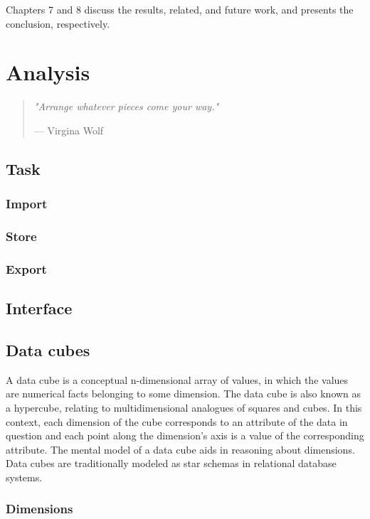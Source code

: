 \documentclass[a4paper,10pt]{book}
\newcommand{\chapterquote}[2] {
\begin{quote}
\textit{"{#1}"}

--- {#2}
\end{quote}

\vspace{24pt}
}
\begin{document}
Chapters 7 and 8 discuss the results, related, and future work, and
presents the conclusion, respectively.




\chapter{Analysis}

\chapterquote{Arrange whatever pieces come your way.}{Virgina Wolf}


\section{Task}

\subsection{Import}

\subsection{Store}

\subsection{Export}

\section{Interface}


\section{Data cubes}

A data cube is a conceptual n-dimensional array of values, in which the values
are numerical facts belonging to some dimension. The data cube is also known as
a hypercube, relating to multidimensional analogues of squares and cubes. In
this context, each dimension of the cube corresponds to an attribute of the
data in question and each point along the dimension's axis is a value of the
corresponding attribute. The mental model of a data cube aids in reasoning
about dimensions. Data cubes are traditionally modeled as star schemas in
relational database systems. \cite{olap_solutions}


\subsection{Dimensions}
\end{document}
